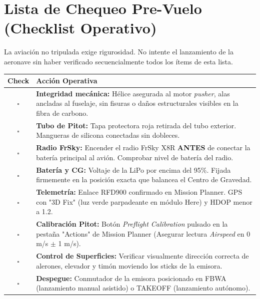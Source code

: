 \documentclass[11pt,a4paper]{article}
\begin{document}
\newpage

\section{Lista de Chequeo Pre-Vuelo (Checklist Operativo)}
La aviación no tripulada exige rigurosidad. No intente el lanzamiento de la aeronave sin haber verificado secuencialmente todos los ítems de esta lista.

\vspace{0.5cm}

\renewcommand{\arraystretch}{1.6}
\begin{tabularx}{\textwidth}{|c|>{\raggedright\arraybackslash}X|}
\hline
\rowcolor{tablehead} \textbf{Check} & \textbf{Acción Operativa} \\ \hline
$\square$ & \textbf{Integridad mecánica:} Hélice asegurada al motor \textit{pusher}, alas ancladas al fuselaje, sin fisuras o daños estructurales visibles en la fibra de carbono. \\ \hline
$\square$ & \textbf{Tubo de Pitot:} Tapa protectora roja retirada del tubo exterior. Mangueras de silicona conectadas sin dobleces. \\ \hline
$\square$ & \textbf{Radio FrSky:} Encender el radio FrSky X8R \textbf{ANTES} de conectar la batería principal al avión. Comprobar nivel de batería del radio. \\ \hline
$\square$ & \textbf{Batería y CG:} Voltaje de la LiPo por encima del 95\%. Fijada firmemente en la posición exacta que balancea el Centro de Gravedad. \\ \hline
$\square$ & \textbf{Telemetría:} Enlace RFD900 confirmado en Mission Planner. GPS con "3D Fix" (luz verde parpadeante en módulo Here) y HDOP menor a 1.2. \\ \hline
$\square$ & \textbf{Calibración Pitot:} Botón \textit{Preflight Calibration} pulsado en la pestaña "Actions" de Mission Planner (Asegurar lectura \textit{Airspeed} en 0 m/s $\pm$ 1 m/s). \\ \hline
$\square$ & \textbf{Control de Superficies:} Verificar visualmente dirección correcta de alerones, elevador y timón moviendo los sticks de la emisora. \\ \hline
$\square$ & \textbf{Despegue:} Conmutador de la emisora posicionado en FBWA (lanzamiento manual asistido) o TAKEOFF (lanzamiento autónomo). \\ \hline
\end{tabularx}

\end{document}
